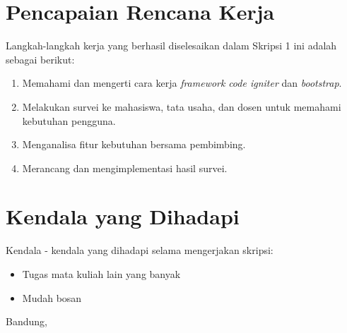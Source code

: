 \documentclass[a4paper,twoside]{article}
\begin{document}
\section{Pencapaian Rencana Kerja}
Langkah-langkah kerja yang berhasil diselesaikan dalam Skripsi 1 ini adalah sebagai berikut:
\begin{enumerate}
\item Memahami dan mengerti cara kerja \textit{framework} \textit{code igniter} dan \textit{bootstrap}.

\item Melakukan survei ke mahasiswa, tata usaha, dan dosen untuk memahami kebutuhan pengguna.

\item Menganalisa fitur kebutuhan bersama pembimbing.

\item Merancang dan mengimplementasi hasil survei.

\end{enumerate}



\section{Kendala yang Dihadapi}

Kendala - kendala yang dihadapi selama mengerjakan skripsi:
\begin{itemize}
	\item Tugas mata kuliah lain yang banyak
	\item Mudah bosan
\end{itemize}


\vspace{1cm}
\centering Bandung, \tanggal\\
\vspace{2cm} \nama \\ 
\vspace{1cm}
\end{document}
